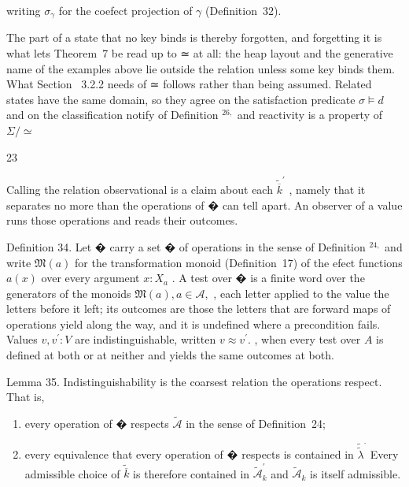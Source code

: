 \documentclass[
  10
]{article}
\begin{document}
writing \(\sigma _ { \gamma }\) for the coefect projection of \(\gamma\)
(Definition~32).

The part of a state that no key binds is thereby forgotten, and
forgetting it is what lets Theorem~7 be read up to ≃ at all: the heap
layout and the generative name of the examples above lie outside the
relation unless some key binds them. What Section~ 3.2.2 needs of ≃
follows rather than being assumed. Related states have the same domain,
so they agree on the satisfaction predicate \(\sigma \models d\) and on
the classification notify of Definition \(^ { 2 6 , }\) and reactivity
is a property of \(\Sigma / \simeq\)

23

Calling the relation observational is a claim about each
\({ \widetilde { \overline { { k } } } } ^ { \prime }\) , namely that it
separates no more than the operations of � can tell apart. An observer
of a value runs those operations and reads their outcomes.

Definition 34. Let � carry a set �︀ of operations in the sense of
Definition \(^ { 2 4 , }\) and write \({ \mathfrak { M } } ( a )\) for
the transformation monoid (Definition~17) of the efect functions
\(a ( x )\) over every argument \(x : X _ { a }\) . A test over �︀ is a
finite word over the generators of the monoids
\({ \mathfrak { M } } ( a ) , a \in { \mathcal { A } } ,\) , each letter
applied to the value the letters before it left; its outcomes are those
the letters that are forward maps of operations yield along the way, and
it is undefined where a precondition fails. Values
\(v , v ^ { \prime } : V\) are indistinguishable, written
\(v \approx v ^ { \prime } .\) , when every test over \(A\) is defined
at both or at neither and yields the same outcomes at both.

Lemma 35. Indistinguishability is the coarsest relation the operations
respect. That is,

\begin{enumerate}
\def\labelenumi{\arabic{enumi}.}
\item
  every operation of �︀ respects \(\widetilde { \mathcal { A } }\) in the
  sense of Definition~24;
\item
  every equivalence that every operation of �︀ respects is contained in
  \({ \widetilde { \widetilde { \lambda } } } ^ { \cdot }\) Every
  admissible choice of \(\widetilde { \overline { { k } } }\) is
  therefore contained in
  \({ \widetilde { \mathcal { A } } } _ { k } ^ { \prime }\) and
  \(\widetilde { \mathcal { A } } _ { k }\) is itself admissible.
\end{enumerate}
\end{document}
